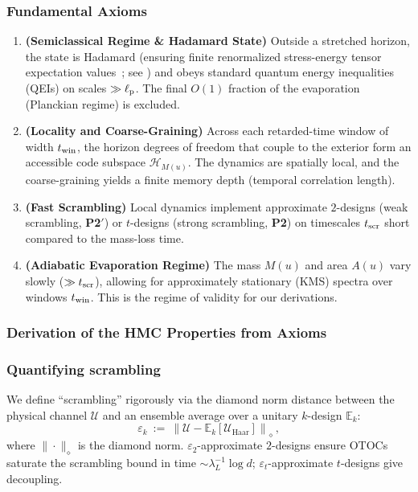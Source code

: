 \documentclass[aps,prd,preprint,onecolumn,superscriptaddress,nofootinbib,longbibliography,floatfix,11pt,showpacs,showkeys]{revtex4-2}
\newcommand{\Ptwo}{\textbf{P2}\xspace}
\newcommand{\PtwoPrime}{\textbf{P2$'$}\xspace}
\newcommand{\HMC}{\textsc{HMC}\xspace}
\theoremstyle{plain}
\theoremstyle{definition}
\theoremstyle{remark}
\begin{document}
\subsubsection{Fundamental Axioms}
\begin{enumerate}[label=\textbf{Axiom \arabic*}:]
  \item \textbf{(Semiclassical Regime \& Hadamard State)} Outside a stretched horizon, the state is Hadamard (ensuring finite renormalized stress-energy tensor expectation values~\cite{Radzikowski:1996}; see ) and obeys standard quantum energy inequalities (QEIs) on scales \(\gg \ell_{\rm p}\).
The final \(O(1)\) fraction of the evaporation (Planckian regime) is excluded.
  \item \textbf{(Locality and Coarse-Graining)} Across each retarded-time window of width $t_{\rm win}$, the horizon degrees of freedom that couple to the exterior form an accessible code subspace $\mathcal{H}_{M(u)}$. The dynamics are spatially local, and the coarse-graining yields a finite memory depth (temporal correlation length).
  \item \textbf{(Fast Scrambling)} Local dynamics implement approximate \(2\)-designs (weak scrambling, \PtwoPrime) or \(t\)-designs (strong scrambling, \Ptwo) on timescales \(t_{\rm scr}\) short compared to the mass-loss time.
  \item \textbf{(Adiabatic Evaporation Regime)} The mass \(M(u)\) and area \(A(u)\) vary slowly (\(\gg t_{\rm scr}\)), allowing for approximately stationary (KMS) spectra over windows \(t_{\rm win}\). This is the regime of validity for our derivations.
\end{enumerate}

\subsubsection{Derivation of the \HMC{} Properties from Axioms}

\subsubsection{Quantifying scrambling}
We define ``scrambling'' rigorously via the diamond norm distance between the physical channel $\mathcal{U}$ and an ensemble average over a unitary $k$-design $\mathbb{E}_k$:
\begin{equation}
\varepsilon_k \ :=\ \left\|\mathcal{U} - \mathbb{E}_k[\mathcal{U}_{\text{Haar}}]\right\|_{\diamond}\,,
\end{equation}
where $\|\cdot\|_{\diamond}$ is the diamond norm. $\varepsilon_2$-approximate $2$-designs ensure OTOCs saturate the scrambling bound in time $\sim \lambda_L^{-1}\log d$; $\varepsilon_t$-approximate $t$-designs give decoupling.
\end{document}
